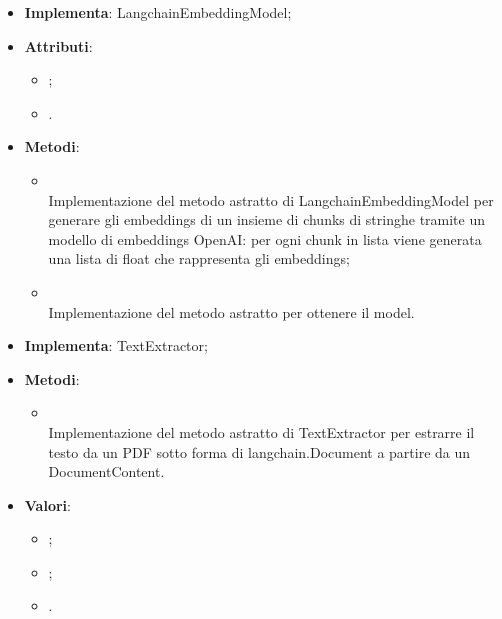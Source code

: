 \documentclass[10pt, a4paper]{article}
\begin{document}
\label{OpenAIEmbeddingModelDettaglio}
\begin{itemize}
    \item \textbf{Implementa}: LangchainEmbeddingModel;
    \item \textbf{Attributi}:
    \begin{itemize}
        \item {};
        \item {}.
    \end{itemize}
    \item \textbf{Metodi}:
    \begin{itemize}
        \item {}\\
        Implementazione del metodo astratto di LangchainEmbeddingModel per generare gli embeddings di un insieme di chunks di stringhe tramite un modello di embeddings OpenAI: per ogni chunk in lista viene generata una lista di float che rappresenta gli embeddings;
        \item {}\\
        Implementazione del metodo astratto per ottenere il model.
    \end{itemize}
\end{itemize}

\label{PDFTextExtractorDettaglio}
\begin{itemize}
    \item \textbf{Implementa}: TextExtractor;
    \item \textbf{Metodi}:
    \begin{itemize}
        \item {}\\
        Implementazione del metodo astratto di TextExtractor per estrarre il testo da un PDF sotto forma di langchain.Document a partire da un DocumentContent.
    \end{itemize}
\end{itemize}



\label{StatusDettaglio}
\begin{itemize}
    \item \textbf{Valori}:
    \begin{itemize}
        \item {};
        \item {};
        \item {}.
    \end{itemize}
\end{itemize}
\end{document}
